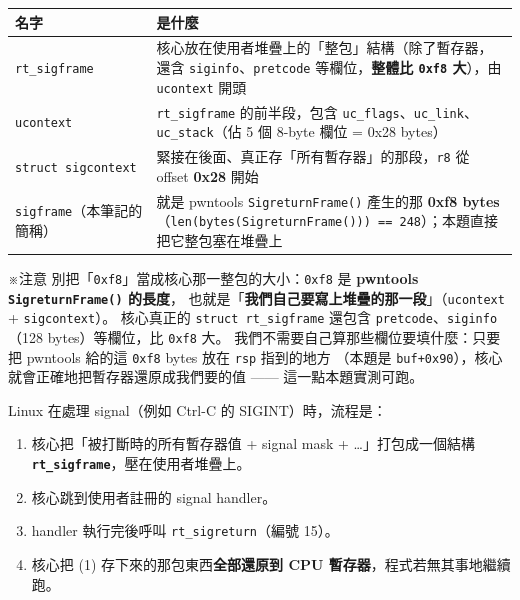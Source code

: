 \documentclass[10pt,a4paper]{article}
\newcounter{none}
\providecommand{\tightlist}{%
  \setlength{\itemsep}{0pt}\setlength{\parskip}{0pt}}
\renewenvironment{quote}{%
  \begin{mdframed}[linewidth=0pt,innerleftmargin=0pt,innerrightmargin=0pt,
    innerbottommargin=0pt,innertopmargin=0pt,skipabove=0.55em,skipbelow=0.55em,
    leftmargin=0.9em,rightmargin=0.4em,startcode={\color{quotebar}\vrule width 2.6pt},%
    endcode={}]%
  \itshape\color{black}%
}{%
  \end{mdframed}%
}
\begin{document}
{\def\LTcaptype{none} %
\begin{longtable}[]{@{}
  >{\raggedright\arraybackslash}p{}
  >{\raggedright\arraybackslash}p{}@{}}
\toprule\noalign{}
\begin{minipage}[b]{\linewidth}\raggedright
名字
\end{minipage} & \begin{minipage}[b]{\linewidth}\raggedright
是什麼
\end{minipage} \\
\midrule\noalign{}
\endhead
\bottomrule\noalign{}
\endlastfoot
\texttt{rt\_\allowbreak{}sigframe} &
核心放在使用者堆疊上的「整包」結構（除了暫存器，還含
\texttt{siginfo}、\texttt{pretcode} 等欄位，\textbf{整體比 \texttt{0xf8}
大}），由 \texttt{ucontext} 開頭 \\
\texttt{ucontext} & \texttt{rt\_\allowbreak{}sigframe} 的前半段，包含
\texttt{uc\_\allowbreak{}flags}、\texttt{uc\_\allowbreak{}link}、\texttt{uc\_\allowbreak{}stack}（佔 5 個
8-byte 欄位 = 0x28 bytes） \\
\texttt{struct\ \allowbreak{}sigcontext} &
緊接在後面、真正存「所有暫存器」的那段，\texttt{r8} 從 offset
\textbf{0x28} 開始 \\
\texttt{sigframe}（本筆記的簡稱） & 就是 pwntools
\texttt{SigreturnFrame()} 產生的那 \textbf{0xf8
bytes}（\texttt{len(bytes(SigreturnFrame()))\ \allowbreak{}==\ \allowbreak{}248}）；本題直接把它整包塞在堆疊上 \\
\end{longtable}
}

\begin{quote}
※注意 別把「\texttt{0xf8}」當成核心那一整包的大小：\texttt{0xf8} 是
\textbf{pwntools \texttt{SigreturnFrame()} 的長度}，
也就是「\textbf{我們自己要寫上堆疊的那一段}」（\texttt{ucontext} +
\texttt{sigcontext}）。 核心真正的 \texttt{struct\ \allowbreak{}rt\_\allowbreak{}sigframe} 還包含
\texttt{pretcode}、\texttt{siginfo}（128 bytes）等欄位，比 \texttt{0xf8}
大。 我們不需要自己算那些欄位要填什麼：只要把 pwntools 給的這
\texttt{0xf8} bytes 放在 \texttt{rsp} 指到的地方 （本題是
\texttt{buf+0x90}），核心就會正確地把暫存器還原成我們要的值 ------
這一點本題實測可跑。
\end{quote}

Linux 在處理 signal（例如 Ctrl-C 的 SIGINT）時，流程是：

\begin{enumerate}
\def\labelenumi{\arabic{enumi}.}
\tightlist
\item
  核心把「被打斷時的所有暫存器值 + signal mask + \ldots」打包成一個結構
  \textbf{\texttt{rt\_\allowbreak{}sigframe}}，壓在使用者堆疊上。
\item
  核心跳到使用者註冊的 signal handler。
\item
  handler 執行完後呼叫 \texttt{rt\_\allowbreak{}sigreturn}（編號 15）。
\item
  核心把 (1) 存下來的那包東西\textbf{全部還原到 CPU
  暫存器}，程式若無其事地繼續跑。
\end{enumerate}
\end{document}

